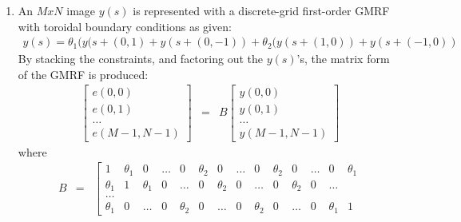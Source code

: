 \documentclass{article}
\begin{document}
\begin{enumerate}
\begin{eqnarray}
\begin{array}{c}
	r_7x + r_8y + r_9Z + T_z - Z'
\end{array}
\right]
\end{eqnarray}
From tracking in $2D$, $x$,$x'$,$y$ and $y'$ are known. However, note the inherent ambiguity 
between $T_z$ and $Z'$.  Any pair of $T_z$, $Z'$ for which 
$Z'-T_z=r_7X+r_8Y+r_9Z$ is a valid solution to the structure and motion for one point (and there 
are an infinite number of these).  Adding correspondences does not help resolve the ambiguity.  Although
each additional correspondance $X'<=>X$ introduces one constraint on $T_z$, it also introduces a new degree 
freedom in $Z_i'$. Thus, the net gain in constraints is zero, and it is impossible to resolve this ambiguity,
regardless of the number of correspondences.

\item An $MxN$ image $y(s)$ is represented with a discrete-grid first-order GMRF with toroidal boundary 
	conditions as given:
\begin{eqnarray*}
	y(s) = \theta_1(y(s+(0,1)+y(s+(0,-1)) + \theta_2(y(s+(1,0))+y(s+(-1,0))
\end{eqnarray*}
By stacking the constraints, and factoring out the $y(s)$'s, the 
matrix form of the GMRF is produced:
\begin{eqnarray*}
\left[ 
	\begin{array}{c}
		e(0,0)\\
		e(0,1)\\
		\dots\\
		e(M-1,N-1)
	\end{array}
\right] 
&=& 
B \left[
	\begin{array}{c}
		y(0,0)\\
		y(0,1)\\
		\dots\\
		y(M-1,N-1)
	\end{array}
\right]
\end{eqnarray*}
where
\begin{eqnarray*}
	B &=&
	\left[
	\begin{array}{cccccccccccccc}
		1 & \theta_1 & 0 & \dots & 0 & \theta_2 & 0 & \dots & 0 & \theta_2 & 0 & \dots & 0 & \theta_1 \\
		\theta_1 & 1 & \theta_1 & 0 & \dots & 0 & \theta_2 & 0 & \dots & 0 & \theta_2 & 0 & \dots \\
		\dots \\
		\theta_1 & 0 & \dots & 0 & \theta_2 & 0 & \dots & 0 & \theta_2 & 0 & \dots & 0 & \theta_1 & 1 

\end{array}
\end{eqnarray*}
\end{enumerate}
\end{document}
